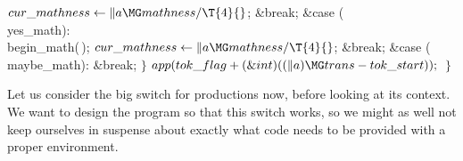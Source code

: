 ${}\\{cur\_mathness}\K\|a\MG\\{mathness}/\T{4}{}$;\6
\&{break};\6
\4\&{case} (\\{yes\_math}):\5
\\{begin\_math}(\,);\6
${}\\{cur\_mathness}\K\|a\MG\\{mathness}/\T{4}{}$;\6
\&{break};\6
\4\&{case} (\\{maybe\_math}):\6
\&{break};\6
\4${}\}{}$\2\6
${}\\{app}(\\{tok\_flag}+(\&{int})((\|a)\MG\\{trans}-\\{tok\_start}));{}$\6
\4${}\}{}$\2\par
\fi

Let us consider the big switch for productions now, before looking
at its context. We want to design the program so that this switch
works, so we might as well not keep ourselves in suspense about exactly what
code needs to be provided with a proper environment.


